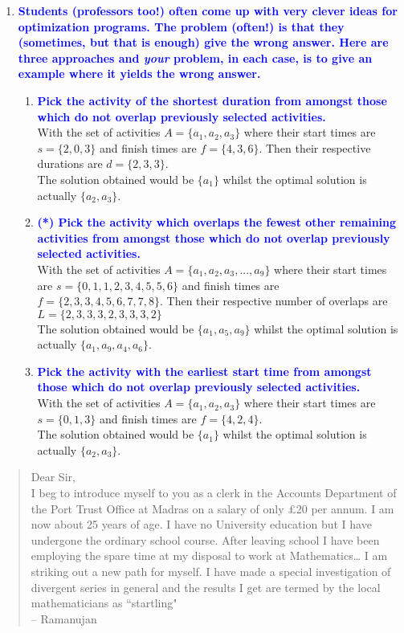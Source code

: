 \documentclass[11pt]{article}
\begin{document}
\begin{enumerate}
\item \textbf{\textcolor{blue}{Students (professors too!) often come up with very clever ideas for
optimization programs.  The problem (often!) is that they (sometimes, but that
is enough) give the wrong answer.  Here are three approaches and {\em your} problem,
in each case, is to give an example where it yields the wrong answer.}}
    \begin{enumerate}
    \item \textbf{\textcolor{blue}{Pick the activity of the shortest duration 
    from amongst those which do not overlap previously selected activities.}}
        \\ With the set of activities $A = \{a_1, a_2, a_3\}$ where their start times are $s = \{2, 0, 3\}$ and finish times are $f = \{4, 3, 6\}$. Then their respective durations are $d = \{2, 3, 3\}$.
        \\ The solution obtained would be $\{a_1\}$ whilst the optimal solution is actually $\{a_2, a_3\}$.
    \item \textbf{\textcolor{blue}{(*) Pick the activity which overlaps the fewest other remaining activities
    from amongst those which do not overlap previously selected activities.}}
        \\ With the set of activities $A = \{a_1, a_2, a_3, ..., a_9\}$ where their start times are $s = \{0, 1, 1, 2, 3, 4, 5, 5, 6\}$ and finish times are $f = \{2, 3, 3, 4, 5, 6, 7, 7, 8\}$. Then their respective number of overlaps are $L = \{2, 3, 3, 3, 2, 3, 3, 3, 2\}$
        \\ The solution obtained would be $\{a_1, a_5, a_9\}$ whilst the optimal solution is actually $\{a_1, a_9, a_4, a_6\}$.
    \item \textbf{\textcolor{blue}{Pick the activity with the earliest start time
    from amongst those which do not overlap previously selected activities.}}
        \\ With the set of activities $A = \{a_1, a_2, a_3\}$ where their start times are $s = \{0, 1, 3\}$ and finish times are $f = \{4, 2, 4\}$.
        \\ The solution obtained would be $\{a_1\}$ whilst the optimal solution is actually $\{a_2, a_3\}$.
    \end{enumerate}
\end{enumerate}


\begin{quote}
Dear Sir,
\\  I beg to introduce myself to you as a clerk in the Accounts Department
of the Port Trust Office at Madras on a salary of only \pounds 20 per
annum.  I am now about 25 years of age.  I have no University education but
I have undergone the ordinary school course.  After leaving school I have
been employing the spare time at my disposal to work at Mathematics\ldots
I am striking out a new path for myself.  I have made a special investigation
of divergent series in general and the results I get are termed
by the local mathematicians as ``startling"  \\ -- Ramanujan

\end{quote}
\end{document}
